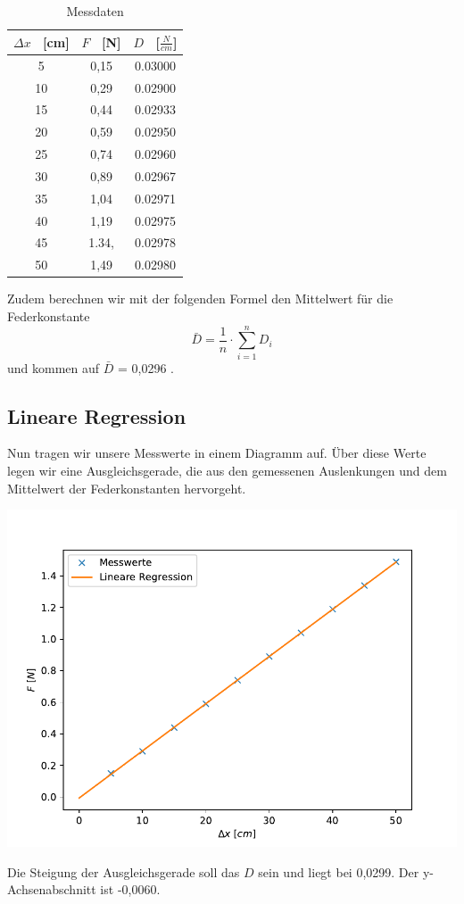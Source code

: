 \documentclass[titlepage = firstcover]{scrartcl}
\begin{document}
        \begin{table}[h]
          \centering
          \caption{Messdaten}
          \label{tab:Tabelle_1}
          
          \begin{tabular}{c c c}
              \toprule
              {$\Delta x$ \ [cm]} & {$F$ \ [N]} & {$D$ \ [$\frac{N}{cm}$]}\\
              \midrule
              5 & 0,15 & 0.03000\\
              10 & 0,29 & 0.02900\\
              15 & 0,44 & 0.02933\\
              20 & 0,59 & 0.02950\\
              25 & 0,74 & 0.02960\\
              30 & 0,89 & 0.02967\\
              35 & 1,04 & 0.02971\\
              40 & 1,19 & 0.02975\\
              45 & 1.34, & 0.02978\\
              50 & 1,49 & 0.02980\\
              \bottomrule
          \end{tabular}    
      \end{table}

      \newpage
      Zudem berechnen wir mit der folgenden Formel den Mittelwert für die Federkonstante 
        \begin{equation}
          \bar{D} = \frac{1}{n} \cdot \sum_{i=1}^{n} D_{i}
        \end{equation}  
      und kommen auf $\bar{D}$ = 0,0296 . 

        
      \subsection{Lineare Regression}
        Nun tragen wir unsere Messwerte in einem Diagramm auf. Über diese Werte legen wir
        eine Ausgleichsgerade, die aus den gemessenen Auslenkungen und dem Mittelwert der Federkonstanten hervorgeht.
        
        \begin{center}
          \includegraphics[width=0.6\linewidth]{Hookgraph.pdf}
        \end{center}

        Die Steigung der Ausgleichsgerade soll das $D$ sein und liegt bei 0,0299. Der y-Achsenabschnitt ist -0,0060.

        
\end{document}
